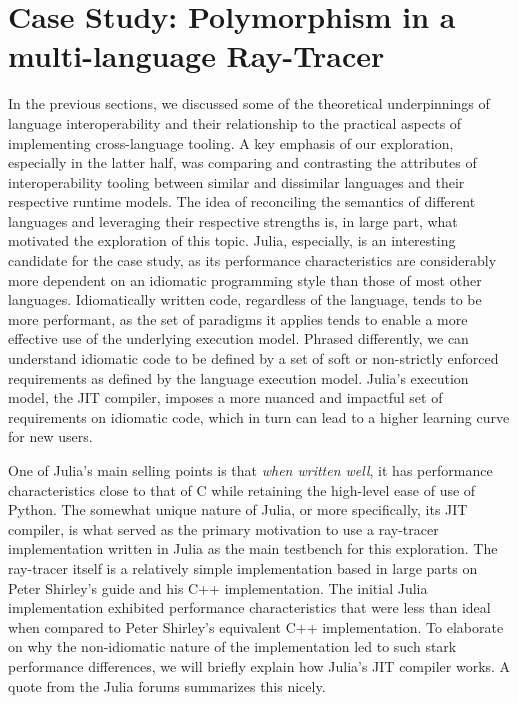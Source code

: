 \section{Case Study: Polymorphism in a multi-language Ray-Tracer}\label{s:implementation}

In the previous sections, we discussed some of the theoretical underpinnings of language interoperability and their relationship to the practical aspects of implementing cross-language tooling. A key emphasis of our exploration, especially in the latter half, was comparing and contrasting the attributes of interoperability tooling between similar and dissimilar languages and their respective runtime models. The idea of reconciling the semantics of different languages and leveraging their respective strengths is, in large part, what motivated the exploration of this topic. Julia, especially, is an interesting candidate for the case study, as its performance characteristics are considerably more dependent on an idiomatic programming style than those of most other languages. Idiomatically written code, regardless of the language, tends to be more performant, as the set of paradigms it applies tends to enable a more effective use of the underlying execution model. Phrased differently, we can understand idiomatic code to be defined by a set of soft or non-strictly enforced requirements as defined by the language execution model. Julia's execution model, the JIT compiler, imposes a more nuanced and impactful set of requirements on idiomatic code, which in turn can lead to a higher learning curve for new users. 

One of Julia's main selling points is that \textit{when written well}, it has performance characteristics close to that of C while retaining the high-level ease of use of Python. The somewhat unique nature of Julia, or more specifically, its JIT compiler, is what served as the primary motivation to use a ray-tracer implementation written in Julia as the main testbench for this exploration. The ray-tracer itself is a relatively simple implementation based in large parts on Peter Shirley's guide \cite{Shirley2024RTW1, Shirley2024RTW2} and his C++ implementation. The initial Julia implementation exhibited performance characteristics that were less than ideal when compared to Peter Shirley's equivalent C++ implementation. To elaborate on why the non-idiomatic nature of the implementation led to such stark performance differences, we will briefly explain how Julia's JIT compiler works. A quote from the Julia forums summarizes this nicely. 

